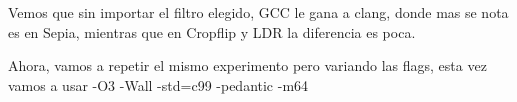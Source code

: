 \begin{figure}[H]
    \centering
    \begin{floatrow}
    \end{floatrow}
\end{figure}

Vemos que sin importar el filtro elegido, GCC le gana a clang, donde mas se nota es en Sepia, mientras que en Cropflip y LDR la diferencia es poca.


Ahora, vamos a repetir el mismo experimento pero variando las flags, esta vez vamos a usar
-O3 -Wall -std=c99 -pedantic -m64

\begin{figure}[H]
    \centering
    \begin{floatrow}
    \end{floatrow}
\end{figure}


